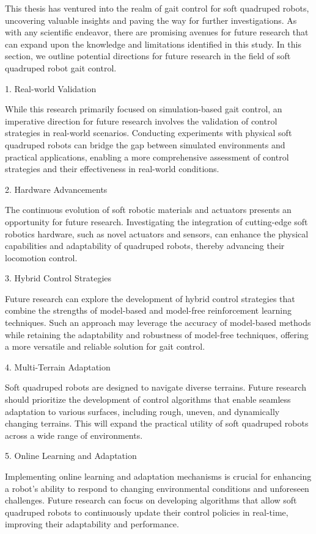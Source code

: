 This thesis has ventured into the realm of gait control for soft quadruped robots, uncovering valuable insights and paving the way for further investigations. As with any scientific endeavor, there are promising avenues for future research that can expand upon the knowledge and limitations identified in this study. In this section, we outline potential directions for future research in the field of soft quadruped robot gait control.

1. Real-world Validation

While this research primarily focused on simulation-based gait control, an imperative direction for future research involves the validation of control strategies in real-world scenarios. Conducting experiments with physical soft quadruped robots can bridge the gap between simulated environments and practical applications, enabling a more comprehensive assessment of control strategies and their effectiveness in real-world conditions.

2. Hardware Advancements

The continuous evolution of soft robotic materials and actuators presents an opportunity for future research. Investigating the integration of cutting-edge soft robotics hardware, such as novel actuators and sensors, can enhance the physical capabilities and adaptability of quadruped robots, thereby advancing their locomotion control.

3. Hybrid Control Strategies

Future research can explore the development of hybrid control strategies that combine the strengths of model-based and model-free reinforcement learning techniques. Such an approach may leverage the accuracy of model-based methods while retaining the adaptability and robustness of model-free techniques, offering a more versatile and reliable solution for gait control.

4. Multi-Terrain Adaptation

Soft quadruped robots are designed to navigate diverse terrains. Future research should prioritize the development of control algorithms that enable seamless adaptation to various surfaces, including rough, uneven, and dynamically changing terrains. This will expand the practical utility of soft quadruped robots across a wide range of environments.

5. Online Learning and Adaptation

Implementing online learning and adaptation mechanisms is crucial for enhancing a robot's ability to respond to changing environmental conditions and unforeseen challenges. Future research can focus on developing algorithms that allow soft quadruped robots to continuously update their control policies in real-time, improving their adaptability and performance.

